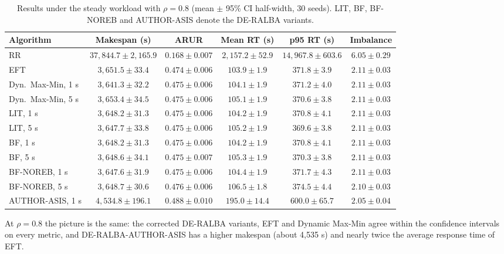 \documentclass[default,sn-mathphys,Numbered]{sn-jnl}
\begin{document}
\begin{table}[h]
\caption{Results under the steady workload with $\rho = 0.8$ (mean $\pm$ 95\% CI half-width, 30 seeds). LIT, BF, BF-NOREB and AUTHOR-ASIS denote the DE-RALBA variants.}\label{tab:rho08}
\centering
\fontsize{6.6pt}{8pt}\selectfont
\setlength{\tabcolsep}{2pt}
\begin{tabular}{lccccc}
\toprule
Algorithm & Makespan (s) & ARUR & Mean RT (s) & p95 RT (s) & Imbalance \\
\midrule
RR & $37{,}844.7 \pm 2{,}165.9$ & $0.168 \pm 0.007$ & $2{,}157.2 \pm 52.9$ & $14{,}967.8 \pm 603.6$ & $6.05 \pm 0.29$ \\
EFT & $3{,}651.5 \pm 33.4$ & $0.474 \pm 0.006$ & $103.9 \pm 1.9$ & $371.8 \pm 3.9$ & $2.11 \pm 0.03$ \\
Dyn.\ Max-Min, 1 s & $3{,}641.3 \pm 32.2$ & $0.475 \pm 0.006$ & $104.1 \pm 1.9$ & $371.2 \pm 4.0$ & $2.11 \pm 0.03$ \\
Dyn.\ Max-Min, 5 s & $3{,}653.4 \pm 34.5$ & $0.475 \pm 0.006$ & $105.1 \pm 1.9$ & $370.6 \pm 3.8$ & $2.11 \pm 0.03$ \\
LIT, 1 s & $3{,}648.2 \pm 31.3$ & $0.475 \pm 0.006$ & $104.2 \pm 1.9$ & $370.8 \pm 4.1$ & $2.11 \pm 0.03$ \\
LIT, 5 s & $3{,}647.7 \pm 33.8$ & $0.475 \pm 0.006$ & $105.2 \pm 1.9$ & $369.6 \pm 3.8$ & $2.11 \pm 0.03$ \\
BF, 1 s & $3{,}648.2 \pm 31.3$ & $0.475 \pm 0.006$ & $104.2 \pm 1.9$ & $370.8 \pm 4.1$ & $2.11 \pm 0.03$ \\
BF, 5 s & $3{,}648.6 \pm 34.1$ & $0.475 \pm 0.007$ & $105.3 \pm 1.9$ & $370.3 \pm 3.8$ & $2.11 \pm 0.03$ \\
BF-NOREB, 1 s & $3{,}647.6 \pm 31.9$ & $0.475 \pm 0.006$ & $104.4 \pm 1.9$ & $371.7 \pm 4.3$ & $2.11 \pm 0.03$ \\
BF-NOREB, 5 s & $3{,}648.7 \pm 30.6$ & $0.476 \pm 0.006$ & $106.5 \pm 1.8$ & $374.5 \pm 4.4$ & $2.10 \pm 0.03$ \\
AUTHOR-ASIS, 1 s & $4{,}534.8 \pm 196.1$ & $0.488 \pm 0.010$ & $195.0 \pm 14.4$ & $600.0 \pm 65.7$ & $2.05 \pm 0.04$ \\
\bottomrule
\end{tabular}
\end{table}

At $\rho = 0.8$ the picture is the same: the corrected DE-RALBA variants, EFT and Dynamic Max-Min agree within the confidence intervals on every metric, and DE-RALBA-AUTHOR-ASIS has a higher makespan (about 4,535 s) and nearly twice the average response time of EFT.
\end{document}
